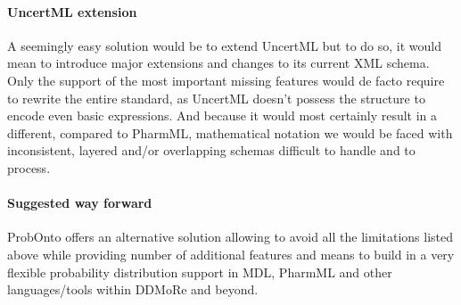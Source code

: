 \paragraph{UncertML extension} A seemingly easy solution would be to extend UncertML 
but to do so, it would mean to introduce major extensions and changes to its 
current XML schema. Only the support of the most important missing features would 
de facto require to rewrite the entire standard, as UncertML doesn't possess the 
structure to encode even basic expressions. And because it would most 
certainly result in a different, compared to PharmML, mathematical notation we would 
be faced with inconsistent, layered and/or overlapping schemas difficult to handle and 
to process.

\paragraph{Suggested way forward} ProbOnto offers an alternative solution allowing
to avoid all the limitations listed above while providing number of additional features
and means to build in a very flexible probability distribution support in MDL, PharmML 
and other languages/tools within DDMoRe and beyond. 

